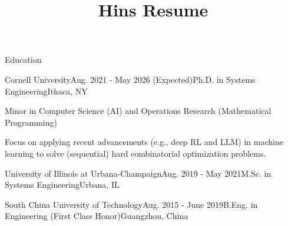 \documentclass{resume} %
\begin{document}
\title{Hins Resume}


\vspace{0.2cm}
\begin{rSection}{Education}
\vspace{0.2cm}
\begin{rSubsection}{Cornell University}{Aug. 2021 - May 2026 (Expected)}{Ph.D. in Systems Engineering}{Ithaca, NY}
\item Minor in Computer Science (AI) and Operations Research (Mathematical Programming)
\item Focus on applying recent advancements (e.g., deep RL and LLM) in machine learning to solve (sequential) hard combinatorial optimization problems.
\end{rSubsection}
\begin{rSubsection}{University of Illinois at Urbana-Champaign}{Aug. 2019 - May 2021}{M.Sc. in Systems Engineering}{Urbana, IL}
\item[]
\vspace{-0.7cm}
\end{rSubsection}
\begin{rSubsection}{South China University of Technology}{Aug. 2015 - June 2019}{B.Eng. in Engineering (First Class Honor)}{Guangzhou, China}
\item[]
\vspace{-0.7cm}
\end{rSubsection}
\end{rSection}
\end{document}
